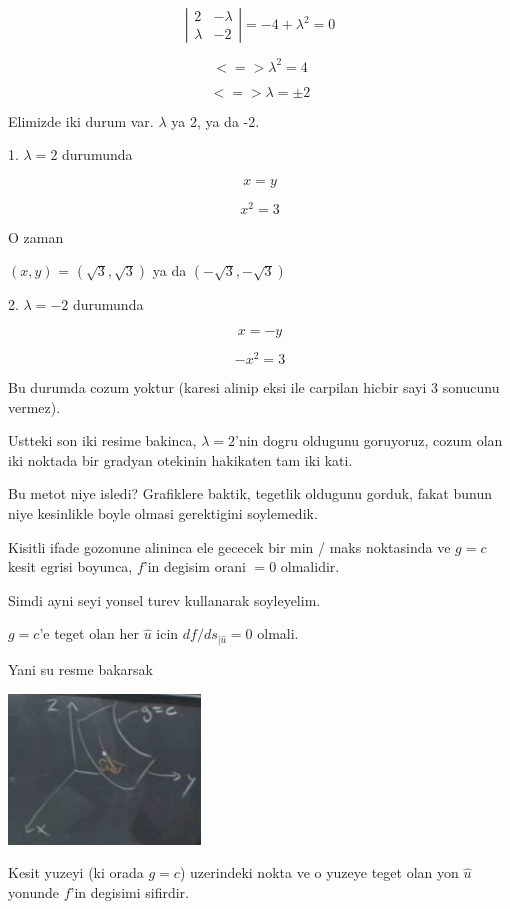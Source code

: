 \documentclass[12pt,fleqn]{article}\usepackage{../common}
\begin{document}
\[ 
\left|\begin{array}{rr}
2 & -\lambda \\
\lambda & -2
\end{array}\right| = -4 + \lambda^2 = 0
 \]

\[ <=> \lambda^2 = 4 \]

\[ <=> \lambda = \pm 2 \]

Elimizde iki durum var. $\lambda$ ya 2, ya da -2. 

1. $\lambda = 2$ durumunda

\[ x = y \]

\[ x^2 = 3 \]

O zaman

$(x,y)$ = $(\sqrt{3}, \sqrt{3})$ ya da $(-\sqrt{3}, -\sqrt{3})$ 

2. $\lambda = -2$ durumunda

\[ x = -y \]

\[ -x^2 = 3 \]

Bu durumda cozum yoktur (karesi alinip eksi ile carpilan hicbir sayi 3
sonucunu vermez). 

Ustteki son iki resime bakinca, $\lambda = 2$'nin dogru oldugunu goruyoruz,
cozum olan iki noktada bir gradyan otekinin hakikaten tam iki kati. 

Bu metot niye isledi? Grafiklere baktik, tegetlik oldugunu gorduk, fakat
bunun niye kesinlikle boyle olmasi gerektigini soylemedik. 

Kisitli ifade gozonune alininca ele gececek bir min / maks noktasinda ve
$g = c$ kesit egrisi boyunca, $f$'in degisim orani $=0$ olmalidir.

Simdi ayni seyi yonsel turev kullanarak soyleyelim. 

$g=c$'e teget olan her $\hat{u}$ icin $df / ds_{|\hat{u}} = 0$ olmali. 

Yani su resme bakarsak

\includegraphics[height=4cm]{13_7.png}

Kesit yuzeyi (ki orada $g=c$) uzerindeki nokta ve o yuzeye teget olan yon
$\hat{u}$ yonunde $f$'in degisimi sifirdir. 
\end{document}
